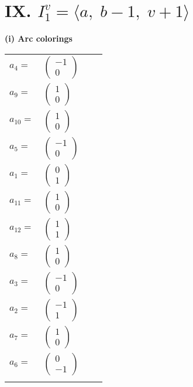 \documentclass[1p]{elsarticle_modified}
\theoremstyle{definition}
\begin{document}
\centering \section*{IX. $I^v_{1}= \langle a,\;b-1,\;v+1 \rangle$}
\flushleft \textbf{(i) Arc colorings}\\
\begin{tabular}{m{7pt} m{180pt} m{7pt} m{180pt} }
\flushright $a_{4}=$&$\begin{pmatrix}-1\\0\end{pmatrix}$ \\
\flushright $a_{9}=$&$\begin{pmatrix}1\\0\end{pmatrix}$ \\
\flushright $a_{10}=$&$\begin{pmatrix}1\\0\end{pmatrix}$ \\
\flushright $a_{5}=$&$\begin{pmatrix}-1\\0\end{pmatrix}$ \\
\flushright $a_{1}=$&$\begin{pmatrix}0\\1\end{pmatrix}$ \\
\flushright $a_{11}=$&$\begin{pmatrix}1\\0\end{pmatrix}$ \\
\flushright $a_{12}=$&$\begin{pmatrix}1\\1\end{pmatrix}$ \\
\flushright $a_{8}=$&$\begin{pmatrix}1\\0\end{pmatrix}$ \\
\flushright $a_{3}=$&$\begin{pmatrix}-1\\0\end{pmatrix}$ \\
\flushright $a_{2}=$&$\begin{pmatrix}-1\\1\end{pmatrix}$ \\
\flushright $a_{7}=$&$\begin{pmatrix}1\\0\end{pmatrix}$ \\
\flushright $a_{6}=$&$\begin{pmatrix}0\\-1\end{pmatrix}$\\&\end{tabular}
\end{document}
